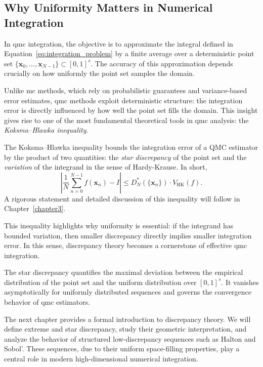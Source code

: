 \subsection{Why Uniformity Matters in Numerical Integration}

In \ac{qmc} integration, the objective is to approximate the integral defined in
Equation~\eqref{eq:integration_problem} by a finite average over a deterministic
point set $\{\boldsymbol{x}_0, \dots, \boldsymbol{x}_{N-1}\} \subset [0,1]^s$.
The accuracy of this approximation depends crucially on how uniformly the point
set samples the domain.

Unlike \ac{mc} methods, which rely on probabilistic guarantees and
variance-based error estimates, \ac{qmc} methods exploit deterministic
structure: the integration error is directly influenced by how well the point
set fills the domain. This insight gives rise to one of the most fundamental
theoretical tools in \ac{qmc} analysis: the \emph{Koksma--Hlawka inequality}.

\begin{remark}
The Koksma--Hlawka inequality bounds the integration error of a QMC estimator by
the product of two quantities: the \emph{star discrepancy} of the point set and
the \emph{variation} of the integrand in the sense of Hardy-Krause. In
short,
\begin{equation*}
    \left| \frac{1}{N} \sum_{n=0}^{N-1} f(\boldsymbol{x}_n) - I \right| 
    \leq D_N^*(\{\boldsymbol{x}_n\}) \cdot V_{\mathrm{HK}}(f).
\end{equation*}
A rigorous statement and detailed discussion of this inequality will follow in
Chapter~\ref{chapter3}.
\end{remark}

This inequality highlights why uniformity is essential: if the integrand has
bounded variation, then smaller discrepancy directly implies smaller integration
error. In this sense, discrepancy theory becomes a cornerstone of effective
\ac{qmc} integration.

\begin{remark}
The star discrepancy quantifies the maximal deviation between the empirical
distribution of the point set and the uniform distribution over $[0,1]^s$. It
vanishes asymptotically for uniformly distributed sequences and governs the
convergence behavior of \ac{qmc} estimators.
\end{remark}

The next chapter provides a formal introduction to discrepancy theory. We will
define extreme and star discrepancy, study their geometric interpretation, and
analyze the behavior of structured low-discrepancy sequences such as Halton and
Sobol'. These sequences, due to their uniform space-filling properties, play a
central role in modern high-dimensional numerical integration.

